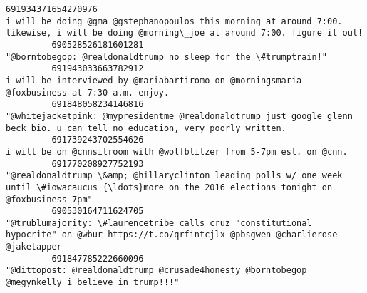 \documentclass[11pt]{article}
\begin{document}
\begin{Verbatim}[commandchars=\\\{\}]
         691934371654270976                                                                                                                                                  i will be doing @gma @gstephanopoulos this morning at around 7:00. likewise, i will be doing @morning\_joe at around 7:00. figure it out!   
         690528526181601281                                                                                                                                                                                                                            "@borntobegop: @realdonaldtrump no sleep for the \#trumptrain!"   
         691943033663782912                                                                                                                                                                                              i will be interviewed by @mariabartiromo on @morningsmaria  @foxbusiness at 7:30 a.m. enjoy.   
         691848058234146816                                                                                                                                                              "@whitejacketpink: @mypresidentme @realdonaldtrump just google glenn beck bio. u can tell no education, very poorly written.   
         691739243702554626                                                                                                                                                                                                                       i will be on @cnnsitroom with @wolfblitzer from 5-7pm est. on @cnn.   
         691770208927752193                                                                                                                                            "@realdonaldtrump \&amp; @hillaryclinton leading polls w/ one week until \#iowacaucus {\ldots}more on the 2016 elections tonight on @foxbusiness 7pm"   
         690530164711624705                                                                                                                                                 "@trublumajority: \#laurencetribe calls cruz "constitutional hypocrite" on @wbur https://t.co/qrfintcjlx @pbsgwen @charlierose @jaketapper   
         691847785222660096                                                                                                                                                                                            "@dittopost: @realdonaldtrump @crusade4honesty @borntobegop @megynkelly i believe in trump!!!"   
         

\end{Verbatim}
\end{document}
